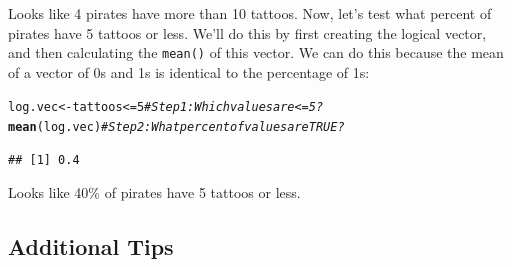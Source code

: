 \documentclass{tufte-book}\usepackage[]{graphicx}\usepackage[]{color}
\makeatletter
\newcommand{\hlnum}[1]{\textcolor[rgb]{0.686,0.059,0.569}{#1}}%
\newcommand{\hlcom}[1]{\textcolor[rgb]{0.678,0.584,0.686}{\textit{#1}}}%
\newcommand{\hlopt}[1]{\textcolor[rgb]{0,0,0}{#1}}%
\newcommand{\hlstd}[1]{\textcolor[rgb]{0.345,0.345,0.345}{#1}}%
\newcommand{\hlkwb}[1]{\textcolor[rgb]{0.69,0.353,0.396}{#1}}%
\newcommand{\hlkwd}[1]{\textcolor[rgb]{0.737,0.353,0.396}{\textbf{#1}}}%
\newenvironment{kframe}{%
 \def\at@end@of@kframe{}%
 \ifinner\ifhmode%
  \def\at@end@of@kframe{\end{minipage}}%
  \begin{minipage}{\columnwidth}%
 \fi\fi%
 \def\FrameCommand##1{\hskip\@totalleftmargin \hskip-\fboxsep
 \colorbox{shadecolor}{##1}\hskip-\fboxsep
     \hskip-\linewidth \hskip-\@totalleftmargin \hskip\columnwidth}%
 \MakeFramed {\advance\hsize-\width
   \@totalleftmargin\z@ \linewidth\hsize
   \@setminipage}}%
 {\par\unskip\endMakeFramed%
 \at@end@of@kframe}
\newenvironment{knitrout}{}{} %
\makeatother
\begin{document}
Looks like 4 pirates have more than 10 tattoos. Now, let's test what percent of pirates have 5 tattoos or less. We'll do this by first creating the logical vector, and then calculating the \texttt{mean()} of this vector. We can do this because the mean of a vector of 0s and 1s is identical to the percentage of 1s:

\begin{knitrout}
\color{fgcolor}\begin{kframe}
\begin{alltt}
\hlstd{log.vec} \hlkwb{<-} \hlstd{tattoos} \hlopt{<=} \hlnum{5} \hlcom{# Step 1: Which values are <= 5?}
\hlkwd{mean}\hlstd{(log.vec)} \hlcom{# Step 2: What percent of values are TRUE?}
\end{alltt}
\begin{verbatim}
## [1] 0.4
\end{verbatim}
\end{kframe}
\end{knitrout}

Looks like 40\% of pirates have 5 tattoos or less.




\subsection{Additional Tips}
\end{document}
